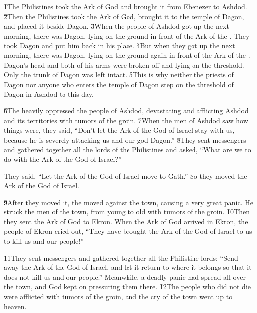 \v{1}The Philistines took the Ark of God and brought it from Ebenezer to Ashdod. \v{2}Then the Philistines took the Ark of God, brought it to the temple of Dagon, and placed it beside Dagon. \v{3}When the people of Ashdod got up the next morning, there was Dagon, lying on the ground in front of the Ark of the . They took Dagon and put him back in his place. \v{4}But when they got up the next morning, there was Dagon, lying on the ground again in front of the Ark of the . Dagon's head and both of his arms were broken off and lying on the threshold. Only the trunk of Dagon was left intact. \v{5}This is why neither the priests of Dagon nor anyone who enters the temple of Dagon step on the threshold of Dagon in Ashdod to this day.

\v{6}The  heavily oppressed the people of Ashdod, devastating and afflicting Ashdod and its territories with tumors of the groin. \v{7}When the men of Ashdod saw how things were, they said, ``Don't let the Ark of the God of Israel stay with us, because he is severely attacking us and our god Dagon.'' \v{8}They sent messengers and gathered together all the lords of the Philistines and asked, ``What are we to do with the Ark of the God of Israel?''

They said, ``Let the Ark of the God of Israel move to Gath.'' So they moved the Ark of the God of Israel.

\v{9}After they moved it, the  moved against the town, causing a very great panic. He struck the men of the town, from young to old with tumors of the groin. \v{10}Then they sent the Ark of God to Ekron. When the Ark of God arrived in Ekron, the people of Ekron cried out, ``They have brought the Ark of the God of Israel to us to kill us and our people!''

\v{11}They sent messengers and gathered together all the Philistine lords: ``Send away the Ark of the God of Israel, and let it return to where it belongs so that it does not kill us and our people.'' Meanwhile, a deadly panic had spread all over the town, and God kept on pressuring them there. \v{12}The people who did not die were afflicted with tumors of the groin, and the cry of the town went up to heaven.

